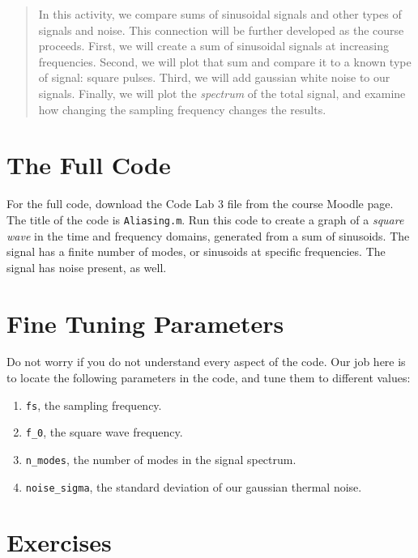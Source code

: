 \documentclass[12pt]{article}
\begin{document}
\twocolumn
\maketitle

\begin{abstract}
In this activity, we compare sums of sinusoidal signals and other types of signals and noise.  This connection will be further developed as the course proceeds.  First, we will create a sum of sinusoidal signals at increasing frequencies.  Second, we will plot that sum and compare it to a known type of signal: square pulses.  Third, we will add gaussian white noise to our signals.  Finally, we will plot the \textit{spectrum} of the total signal, and examine how changing the sampling frequency changes the results.
\end{abstract}

\section{The Full Code}

For the full code, download the Code Lab 3 file from the course Moodle page.  The title of the code is \verb+Aliasing.m+.  Run this code to create a graph of a \textit{square wave} in the time and frequency domains, generated from a sum of sinusoids.  The signal has a finite number of modes, or sinusoids at specific frequencies.  The signal has noise present, as well.

\section{Fine Tuning Parameters}

Do not worry if you do not understand every aspect of the code.  Our job here is to locate the following parameters in the code, and tune them to different values:

\begin{enumerate}
\item \verb+fs+, the sampling frequency.
\item \verb+f_0+, the square wave frequency.
\item \verb+n_modes+, the number of modes in the signal spectrum.
\item \verb+noise_sigma+, the standard deviation of our gaussian thermal noise.
\end{enumerate}

\section{Exercises}
\end{document}
